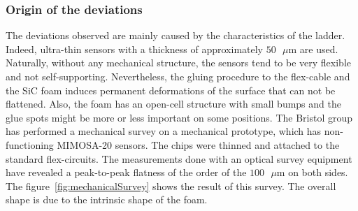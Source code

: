       \subsubsection{Origin of the deviations}

      The deviations observed are mainly caused by the characteristics of the ladder.
      Indeed, ultra-thin sensors with a thickness of approximately $50 \text{ }\mu\text{m}$ are used.
      Naturally, without any mechanical structure, the sensors tend to be very flexible and not self-supporting.
      Nevertheless, the gluing procedure to the flex-cable and the \gls{SiC} foam induces permanent deformations of the surface that can not be flattened.
      Also, the foam has an open-cell structure with small bumps and the glue spots might be more or less important on some positions.
      The Bristol group has performed a mechanical survey on a mechanical prototype, which has non-functioning MIMOSA-20 sensors.
      The chips were thinned and attached to the standard flex-circuits.
      The measurements done with an optical survey equipment have revealed a peak-to-peak flatness of the order of the $100 \text{ }\mu\text{m}$ on both sides.
      The figure~\ref{fig:mechanicalSurvey} shows the result of this survey.
      The overall shape is due to the intrinsic shape of the foam.
       
